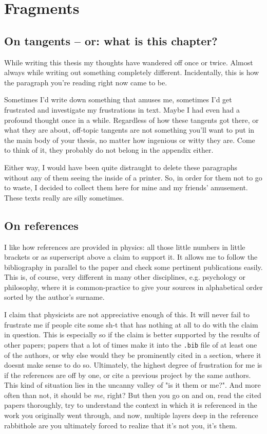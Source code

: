 \chapter{Fragments}
\label{ch:fragments}

\section*{On tangents -- or: what is this chapter?}
While writing this thesis my thoughts have wandered off once or twice. Almost
always while writing out something completely different. Incidentally, this is
how the paragraph you're reading right now came to be.

Sometimes I'd write down something that amuses me, sometimes I'd get frustrated
and investigate my frustrations in text. Maybe I had even had a profound
thought once in a while.  Regardless of how these tangents got there, or what
they are about, off-topic tangents are not something you'll want to put in the
main body of your thesis, no matter how ingenious or witty they are.  Come to
think of it, they probably do not belong in the appendix either.

Either way, I would have been quite distraught to delete these paragraphs
without any of them seeing the inside of a printer. So, in order for them not
to go to waste, I decided to collect them here for mine and my friends'
amusement. These texts really are silly sometimes.

\section*{On references}
I like how references are provided in physics: all those little numbers in
little brackets or as superscript above a claim to support it. It allows me to
follow the bibliography in parallel to the paper and check some pertinent
publications easily. This is, of course, very different in many other
disciplines, e.g. psychology or philosophy, where it is common-practice to give
your sources in alphabetical order sorted by the author's surname.

I claim that physicists are not appreciative enough of this. It will never fail
to frustrate me if people cite some sh-t that has nothing at all to do with the
claim in question. This is especially so if the claim is better supported by
the results of other papers; papers that a lot of times make it into the
\texttt{.bib} file of at least one of the authors, or why else would they be
prominently cited in a section, where it doesnt make sense to do so.
Ultimately, the highest degree of frustration for me is if the references are
off by one, or cite a previous project by the same authors. This kind of
situation lies in the uncanny valley of "is it them or me?". And more often
than not, it should be \emph{me}, right? But then you go on and on, read the
cited papers thoroughly, try to understand the context in which it is
referenced in the work you originally went through, and now, multiple layers
deep in the reference rabbithole are you ultimately forced to realize that it's
not you, it's them. 

